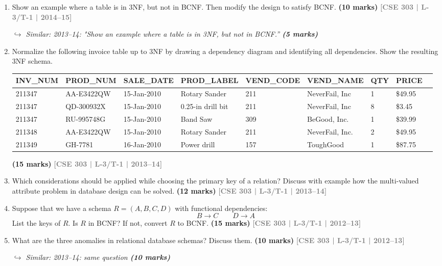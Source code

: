 \documentclass[12pt]{article}
\newcommand{\yr}[1]{\hfill\textcolor{gray}{\small\textbf{[#1]}}}
\newcommand{\mk}[1]{\textcolor{orange!70!black}{\small\textbf{(#1 marks)}}}
\newcommand{\variant}[1]{\par\vspace{1pt}\textcolor{blue!50!black}%
  {\footnotesize\textit{$\hookrightarrow$ Similar: #1}}}
\begin{document}
\begin{enumerate}
\item Show an example where a table is in 3NF, but not in BCNF. Then modify the design to satisfy BCNF.
\mk{10} \yr{CSE 303 | L-3/T-1 | 2014--15}
\variant{2013--14: "Show an example where a table is in 3NF, but not in BCNF.'' \mk{5}}





\item Normalize the following invoice table up to 3NF by drawing a dependency diagram and identifying all dependencies. Show the resulting 3NF schema.

\medskip
\begin{center}
\small
\begin{tabular}{lllllllll}
\toprule
\textbf{INV\_NUM} & \textbf{PROD\_NUM} & \textbf{SALE\_DATE} & \textbf{PROD\_LABEL} & \textbf{VEND\_CODE} & \textbf{VEND\_NAME} & \textbf{QTY} & \textbf{PRICE}\\
\midrule
211347 & AA-E3422QW & 15-Jan-2010 & Rotary Sander & 211 & NeverFail, Inc & 1 & \$49.95\\
211347 & QD-300932X & 15-Jan-2010 & 0.25-in drill bit & 211 & NeverFail, Inc & 8 & \$3.45\\
211347 & RU-995748G & 15-Jan-2010 & Band Saw & 309 & BeGood, Inc. & 1 & \$39.99\\
211348 & AA-E3422QW & 15-Jan-2010 & Rotary Sander & 211 & NeverFail, Inc. & 2 & \$49.95\\
211349 & GH-7781 & 16-Jan-2010 & Power drill & 157 & ToughGood & 1 & \$87.75\\
\bottomrule
\end{tabular}
\end{center}
\mk{15} \yr{CSE 303 | L-3/T-1 | 2013--14}



\item Which considerations should be applied while choosing the primary key of a relation? Discuss with example how the multi-valued attribute problem in database design can be solved.
\mk{12} \yr{CSE 303 | L-3/T-1 | 2013--14}


\item Suppose that we have a schema $R = (A, B, C, D)$ with functional dependencies:
\[B \to C \qquad D \to A\]
List the keys of $R$. Is $R$ in BCNF? If not, convert $R$ to BCNF.
\mk{15} \yr{CSE 303 | L-3/T-1 | 2012--13}





\item What are the three anomalies in relational database schemas? Discuss them.
\mk{10} \yr{CSE 303 | L-3/T-1 | 2012--13}
\variant{2013--14: same question \mk{10}}



\end{enumerate}
\end{document}
